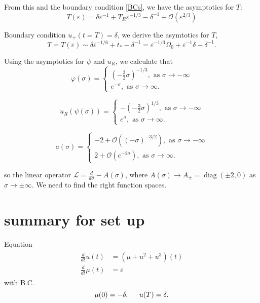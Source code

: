 \documentclass[letterpaper,11pt]{article}
\newcommand{\rmO}{\mathcal{O}}
\newcommand{\eps}{\varepsilon}
\newcommand{\diag}{\operatorname{diag}}
\numberwithin{equation}{section}
\theoremstyle{plain}
\begin{document}
From this and the boundary condition \eqref{BCs}, we have the asymptotics for $T$:
\begin{equation}
T (\eps)= \delta \eps^{-1} + T_R\eps^{-1/3} - \delta^{-1} + \rmO(\eps^{2/3})
\end{equation}


Boundary condition $u_+(t=T)=\delta$, we derive the asymtotics for $T$,
\[
T = T(\eps) \sim \delta\eps^{-1/6} + t_* -\delta^{-1} = \eps^{-1/3}\Omega_0 +\eps^{-1}\delta -\delta^{-1}.
\]


Using the asymptotics for $\psi$ and $u_R$, we calculate that
\begin{equation}
\varphi(\sigma) =\begin{cases}
 (-\frac{3}{2}\sigma)^{-1/3}, \text{ as }\sigma \to -\infty\\
e^{-\sigma} , \text{ as }\sigma \to \infty.
\end{cases}
\end{equation}

\begin{equation}
u_R(\psi(\sigma)) =\begin{cases}
 -(-\frac{3}{2}\sigma)^{1/3}, \text{ as }\sigma \to -\infty\\
e^{\sigma} , \text{ as }\sigma \to \infty.
\end{cases}
\end{equation}

\begin{equation}
a(\sigma) =\begin{cases}
-2+ \rmO((-\sigma)^{-3/2}), \text{ as }\sigma \to -\infty\\
2+ \rmO(e^{-2\sigma}), \text{ as }\sigma \to \infty.
\end{cases}
\end{equation}

so the linear operator $\mathcal{L} = \frac{d}{d\sigma} - A(\sigma)$, where $A(\sigma) \to A_\pm = \diag(\pm 2, 0)$ as $\sigma \to \pm \infty$. We need to find the right function spaces.



\pagebreak

\section{summary for set up}
Equation
\begin{align}
\begin{split}
\frac{d}{dt}u(t) &= (\mu+u^2+u^3)(t) \\
\frac{d}{dt}\mu (t)&=  \eps 
\end{split}
\end{align}
with B.C.
\begin{equation}
\mu(0) = -\delta, \hspace{0.2in} u(T) = \delta.
\end{equation}
\end{document}
